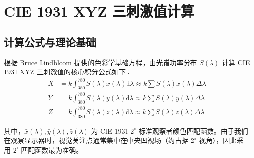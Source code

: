 \documentclass[12pt, a4paper]{ctexart}
\begin{document}
\begin{abstract}
本报告基于 PhotoResearch PR-788 测量的显示屏白场原始光谱功率分布数据（380nm - 780nm），依据 CIE 1931 标准色度观察者模型，计算了目标光源的三刺激值。报告详细探讨了常数 $k$ 在不同影像工业标准下的三种取值意义。在此基础上，推导了色品坐标（CIE 1931 $xy$ 及 CIE 1976 $u'v'$），并利用多种经典算法（McCamy、Hernández-Andrés、Robertson）交叉验证并精确计算了相关色温（CCT），为后续的监视器校准与色彩管理提供了底层数据支撑。报告中的核心色彩空间转换公式参考自 Bruce Lindbloom 的色彩学规范。
\end{abstract}

\vspace{2em}

\tableofcontents

\newpage

\section{CIE 1931 XYZ 三刺激值计算}

\subsection{计算公式与理论基础}
根据 Bruce Lindbloom 提供的色彩学基础方程，由光谱功率分布 $S(\lambda)$ 计算 CIE 1931 XYZ 三刺激值的核心积分公式如下：
\begin{align}
    X &= k \int_{380}^{780} S(\lambda) \bar{x}(\lambda) \mathrm{d}\lambda \approx k \sum S(\lambda) \bar{x}(\lambda) \Delta\lambda \\
    Y &= k \int_{380}^{780} S(\lambda) \bar{y}(\lambda) \mathrm{d}\lambda \approx k \sum S(\lambda) \bar{y}(\lambda) \Delta\lambda \\
    Z &= k \int_{380}^{780} S(\lambda) \bar{z}(\lambda) \mathrm{d}\lambda \approx k \sum S(\lambda) \bar{z}(\lambda) \Delta\lambda
\end{align}

其中，$\bar{x}(\lambda), \bar{y}(\lambda), \bar{z}(\lambda)$ 为 CIE 1931 $2^\circ$ 标准观察者颜色匹配函数。由于我们在观察显示器时，视觉关注点通常集中在中央凹视场（约占据 $2^\circ$ 视角），因此采用 $2^\circ$ 匹配函数最为准确。
\end{document}
